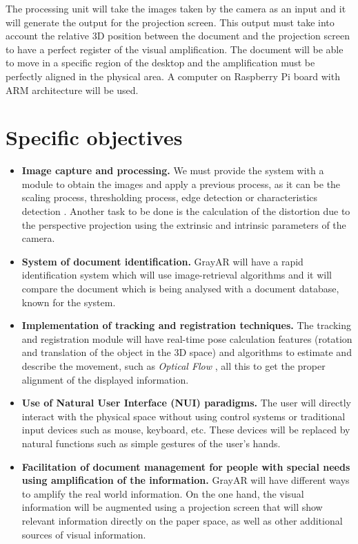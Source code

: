 The processing unit will take the images taken by the camera as an input and it will generate the output for the projection screen. This output must take into account the relative 3D position between the document and the projection screen to have a perfect register of the visual amplification. The document will be able to move in a specific region of the desktop and the amplification must be perfectly aligned in the physical area. A computer on Raspberry Pi board with ARM architecture will be used. 

\section{Specific objectives}
\begin{itemize}
\item \textbf{Image capture and processing.} We must provide the system with a module to obtain the images and apply a previous process, as it can be the scaling process, thresholding process, edge detection or characteristics detection  \cite{Ortiz} \cite{Bay}. Another task to be done is the calculation of the distortion due to the perspective projection using the extrinsic and intrinsic parameters of the camera. 

\item \textbf{System of document identification.} GrayAR will have a rapid identification system which will use image-retrieval algorithms and it will compare the document which is being analysed with a document database, known for the system. 

\item \textbf{Implementation of tracking and registration techniques.}
The tracking and registration module will have real-time pose calculation features (rotation and translation of the object in the 3D space) and algorithms to estimate and describe the movement, such as \textit{Optical Flow} \cite{LKanade}, all this to get the proper alignment of the displayed information.

\item \textbf{Use of Natural User Interface (NUI) paradigms.}
The user will directly interact with the physical space without using control systems or traditional input devices such as mouse, keyboard, etc. These devices will be replaced by natural functions such as simple gestures of the user’s hands. 

\item \textbf{Facilitation of document management for people with special needs using amplification of the information.} GrayAR will have different ways to amplify the real world information. On the one hand, the visual information will be augmented using a projection screen that will show relevant information directly on the paper space, as well as other additional sources of visual information. 


\end{itemize}
